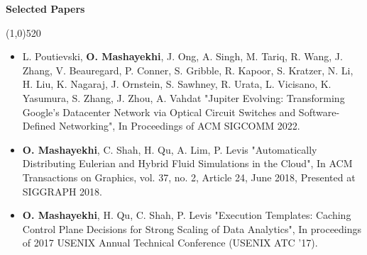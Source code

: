 \documentclass[letterpaper,10pt]{article}
\newcommand{\heading}[1] {
  {\large
    \begin{minipage}
    {\textwidth}
    {\textbf{#1}}
    \end{minipage}
  }
  \begin{center}
  \vspace{-15pt}
  \line(1,0){520}
  \end{center}
}
\begin{document}
\vspace{5pt}




\heading{Selected Papers}

\begin{itemize}[noitemsep,topsep=0pt, leftmargin=.5cm, rightmargin=.5cm]

\item[]
L. Poutievski, \textbf{O. Mashayekhi}, J. Ong, A. Singh, M. Tariq, R. Wang,
J. Zhang, V. Beauregard, P. Conner, S. Gribble, R. Kapoor, S. Kratzer,
N. Li, H. Liu, K. Nagaraj, J. Ornstein, S. Sawhney, R. Urata, L. Vicisano,
K. Yasumura, S. Zhang, J. Zhou, A. Vahdat
"Jupiter Evolving: Transforming Google's Datacenter Network via Optical Circuit Switches and Software-Defined Networking",
In Proceedings of ACM SIGCOMM 2022.

\vspace{5pt}

\item[]
\textbf{O. Mashayekhi}, C. Shah, H. Qu, A. Lim, P. Levis
"Automatically Distributing Eulerian and Hybrid Fluid Simulations in the Cloud",
In ACM Transactions on Graphics, vol. 37, no. 2, Article 24, June 2018, Presented at SIGGRAPH 2018.

\vspace{5pt}

\item[]
\textbf{O. Mashayekhi}, H. Qu, C. Shah, P. Levis
"Execution Templates: Caching Control Plane Decisions for Strong Scaling of Data Analytics",
In proceedings of 2017 USENIX Annual Technical Conference (USENIX ATC '17).


\end{itemize}
\end{document}
